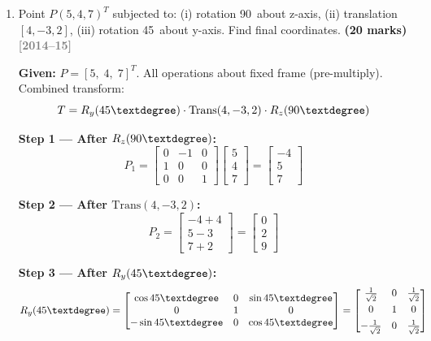 \documentclass[12pt,a3paper]{article}
\newcommand{\yr}[1]{\hfill\textcolor{gray}{\small\textbf{[#1]}}}
\newcommand{\mk}[1]{\textcolor{orange!70!black}{\small\textbf{(#1 marks)}}}
\begin{document}
\begin{enumerate}
\begin{tcolorbox}[enhanced,breakable,ansbox,colback=cD!4,colframe=cD,
  boxrule=0.8pt,arc=5pt,
  title={\textbf{Answer}},fonttitle=\bfseries\color{white},colbacktitle=cD]
\end{tcolorbox}

\item \label{qlabel:C4-Q3}
Point $P(5,4,7)^T$ subjected to: (i) rotation 90\textdegree\ about
z-axis, (ii) translation $[4,-3,2]$, (iii) rotation 45\textdegree\
about y-axis. Find final coordinates. \mk{20}
\yr{2014--15}

\begin{tcolorbox}[enhanced,breakable,ansbox,colback=cD!4,colframe=cD,
  boxrule=0.8pt,arc=5pt,
  title={\textbf{Answer}},fonttitle=\bfseries\color{white},colbacktitle=cD]

\textbf{Given:} $P = [5,\;4,\;7]^T$. All operations about fixed frame
(pre-multiply). Combined transform:
\[
  T = R_y(45\textdegree)\cdot\mathrm{Trans}(4,-3,2)\cdot R_z(90\textdegree)
\]

\textbf{Step 1 — After $R_z(90\textdegree)$:}
\[
  P_1 = \begin{bmatrix}0&-1&0\\1&0&0\\0&0&1\end{bmatrix}
  \begin{bmatrix}5\\4\\7\end{bmatrix}
  = \begin{bmatrix}-4\\5\\7\end{bmatrix}
\]

\textbf{Step 2 — After $\mathrm{Trans}(4,-3,2)$:}
\[
  P_2 = \begin{bmatrix}-4+4\\5-3\\7+2\end{bmatrix}
  = \begin{bmatrix}0\\2\\9\end{bmatrix}
\]

\textbf{Step 3 — After $R_y(45\textdegree)$:}
\[
  R_y(45\textdegree) =
  \begin{bmatrix}
    \cos45\textdegree & 0 & \sin45\textdegree\\
    0 & 1 & 0\\
    -\sin45\textdegree & 0 & \cos45\textdegree
  \end{bmatrix}
  = \begin{bmatrix}
    \frac{1}{\sqrt{2}} & 0 & \frac{1}{\sqrt{2}}\\[4pt]
    0 & 1 & 0\\[4pt]
    -\frac{1}{\sqrt{2}} & 0 & \frac{1}{\sqrt{2}}
  \end{bmatrix}
\]


\end{tcolorbox}
\end{enumerate}
\end{document}
